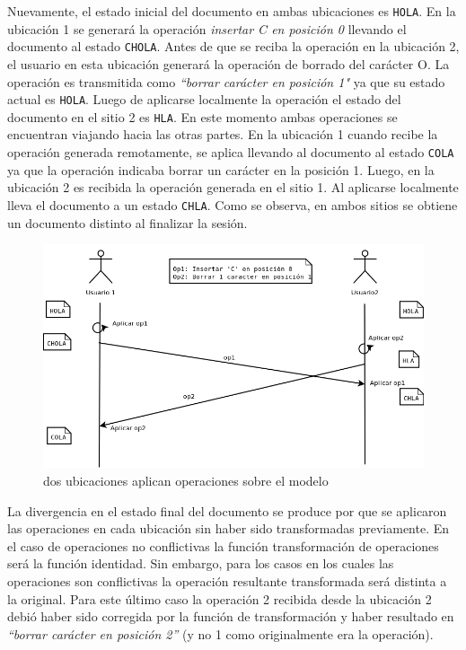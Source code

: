 \documentclass[12pt,a4paper]{article}
\begin{document}
	Nuevamente, el estado inicial del documento en ambas ubicaciones es \texttt{HOLA}. En la ubicación 1
	se generará la operación \textit{insertar C en posición 0} llevando el documento al estado \texttt{CHOLA}.
	Antes de que se reciba la operación en la ubicación 2, el usuario en esta ubicación generará la operación
	de borrado del carácter O. La operación es transmitida como \textit{``borrar carácter en posición 1"} ya que
	su estado actual es \texttt{HOLA}. Luego de aplicarse localmente la operación el estado del documento en
	el sitio 2 es \texttt{HLA}.
	En este momento ambas operaciones se encuentran viajando hacia las otras partes. En la ubicación 1 cuando recibe
	la operación generada remotamente, se aplica llevando al documento al estado \texttt{COLA} ya que la
	operación indicaba borrar un carácter en la posición 1. Luego, en la ubicación 2 es recibida la operación
	generada en el sitio 1. Al aplicarse localmente lleva el documento a un estado \texttt{CHLA}.
	Como se observa, en ambos sitios se obtiene un documento distinto al finalizar la sesión.

	\begin{figure}[!ht]
		\begin{center}
			\includegraphics[width=14cm]{sincronizacion_fallida.png}
			\caption{\label{secuencia_ops_2} dos ubicaciones aplican operaciones sobre el modelo }
		\end{center}
	\end{figure}

	La divergencia en el estado final del documento se produce por que se aplicaron las operaciones en cada 
	ubicación sin haber sido transformadas previamente. En el caso de operaciones no conflictivas la función
	transformación de operaciones será la función  identidad. Sin embargo, para los casos en los cuales las
	operaciones son conflictivas la operación resultante transformada será distinta a la original.
	Para este último caso la operación 2 recibida desde la ubicación 2 debió haber sido corregida por la función
	de transformación y haber resultado en \textit{“borrar carácter en posición 2”} (y no 1 como originalmente
	era la operación). \\
	
\end{document}
